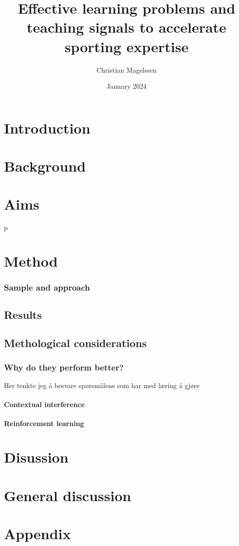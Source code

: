\documentclass{report}
\title{Effective learning problems and teaching signals to accelerate sporting expertise}
\author{Christian Magelssen}
\date{January 2024}
\begin{document}
\maketitle

\listoffigures

\chapter{Introduction}


\chapter{Background}


\chapter{Aims}



p
\chapter{Method}



\subsection{Sample and approach}


\section{Results}



\section{Methological considerations}

\subsection{Why do they perform better?}
Her tenkte jeg å besvare spørsmålene som har med læring å gjøre

\subsubsection{Contextual interference}

\subsubsection{Reinforcement learning}


\chapter{Disussion}




\chapter{General discussion}


\chapter{Appendix}


\printbibliography
\end{document}
